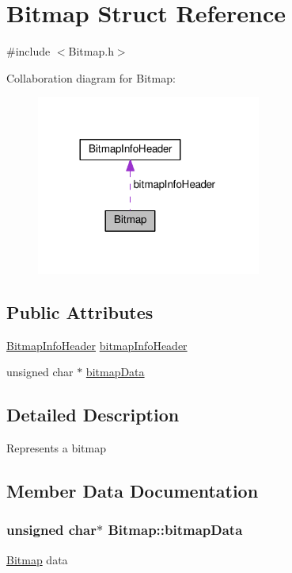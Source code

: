 \hypertarget{structBitmap}{}\section{Bitmap Struct Reference}
\label{structBitmap}


{\ttfamily \#include $<$Bitmap.\+h$>$}



Collaboration diagram for Bitmap\+:\nopagebreak
\begin{figure}[H]
\begin{center}
\leavevmode
\includegraphics[width=209pt]{structBitmap__coll__graph}
\end{center}
\end{figure}
\subsection*{Public Attributes}
\begin{DoxyCompactItemize}
\item 
\hyperlink{structBitmapInfoHeader}{Bitmap\+Info\+Header} \hyperlink{structBitmap_a95c481a5ce1ff4af08cd135ca4af120b}{bitmap\+Info\+Header}
\item 
unsigned char $\ast$ \hyperlink{structBitmap_a581eac36ec50d730299b6df60e644750}{bitmap\+Data}
\end{DoxyCompactItemize}


\subsection{Detailed Description}
Represents a bitmap 

\subsection{Member Data Documentation}
\subsubsection[{\texorpdfstring{bitmap\+Data}{bitmapData}}]{\setlength{\rightskip}{0pt plus 5cm}unsigned char$\ast$ Bitmap\+::bitmap\+Data}\hypertarget{structBitmap_a581eac36ec50d730299b6df60e644750}{}\label{structBitmap_a581eac36ec50d730299b6df60e644750}
\hyperlink{structBitmap}{Bitmap} data 
